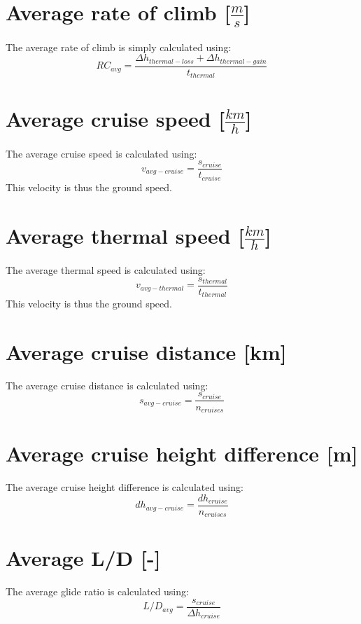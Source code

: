 \section{Average rate of climb [$\frac{m}{s}$]}
The average rate of climb is simply calculated using:
\begin{equation}
R{C_{avg}} = \frac{{\Delta {h_{thermal - loss}} + \Delta {h_{thermal - gain}}}}{{{t_{thermal}}}}
\end{equation}

\section{Average cruise speed [$\frac{km}{h}$]}
The average cruise speed is calculated using:
\begin{equation}
{v_{avg - cruise}} = \frac{{{s_{cruise}}}}{{{t_{cruise}}}}
\end{equation}
This velocity is thus the ground speed.

\section{Average thermal speed [$\frac{km}{h}$]}
The average thermal speed is calculated using:
\begin{equation}
{v_{avg - thermal}} = \frac{{{s_{thermal}}}}{{{t_{thermal}}}}
\end{equation}
This velocity is thus the ground speed.

\section{Average cruise distance [km]}
The average cruise distance is calculated using:
\begin{equation}
{s_{avg - cruise}} = \frac{{{s_{cruise}}}}{{{n_{cruises}}}}
\end{equation}

\section{Average cruise height difference [m]}
The average cruise height difference is calculated using:
\begin{equation}
	{dh_{avg - cruise}} = \frac{{{dh_{cruise}}}}{{{n_{cruises}}}}
\end{equation}

\section{Average L/D [-]}
The average glide ratio is calculated using:
\begin{equation}
L/{D_{avg}} = \frac{{{s_{cruise}}}}{{\Delta {h_{cruise}}}}
\end{equation}

